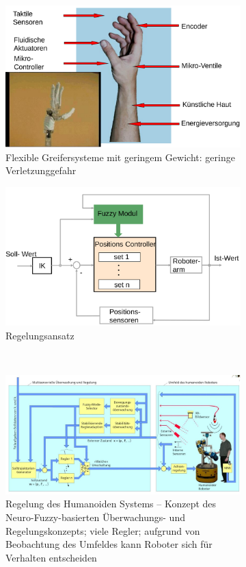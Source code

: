 \begin{figure}[h!]
	\centering
	\begin{subfigure}{.4\textwidth}
		\includegraphics[width=\textwidth]{figures/flexible_greifersysteme.png}
		\caption{Flexible Greifersysteme mit geringem Gewicht: geringe Verletzunggefahr}
	\end{subfigure}
	\begin{subfigure}{.4\textwidth}
		\includegraphics[width=\textwidth]{figures/regelungsansatz.png}
		\caption{Regelungsansatz}
	\end{subfigure}\\
	\begin{subfigure}{.7\textwidth}
		\includegraphics[width=\textwidth]{figures/regelung_humanoider.png}
		\caption{Regelung des Humanoiden Systems -- Konzept des Neuro-Fuzzy-basierten Überwachungs- und Regelungskonzepts; viele Regler; aufgrund von Beobachtung des Umfeldes kann Roboter sich für Verhalten entscheiden}
	\end{subfigure}
	\caption{}
\end{figure}

